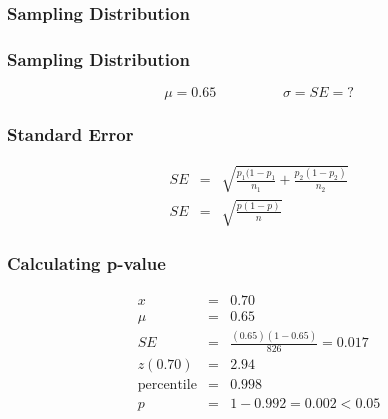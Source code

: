 \documentclass{beamer}
\begin{document}
\begin{frame}
  \frametitle{Sampling Distribution}
  \centering
\end{frame}

\begin{frame}
  \frametitle{Sampling Distribution}
  \centering
  \begin{equation*}
    \mu = 0.65 \hspace{2cm} \sigma = SE = ?
  \end{equation*}
\end{frame}

\begin{frame}
  \frametitle{Standard Error}
  \begin{displaymath}
    \begin{array}{rcl}
      SE & = & \sqrt{ \frac{p_1(1-p_1}{n_1} + \frac{p_2(1-p_2)}{n_2}
      }\\[2em]
      SE & = & \sqrt{ \frac{p(1-p)}{n}} 
    \end{array}
  \end{displaymath} 
\end{frame}

\begin{frame}
  \frametitle{Calculating p-value}
  \begin{displaymath}
    \begin{array}{rcl}
      x & = & 0.70 \\[2em]
      \mu & = & 0.65\\[2em]
      SE & = & \frac{(0.65)(1-0.65)}{826} = 0.017\\[2em]
      z(0.70) & = & 2.94 \\[2em]
      \text{percentile} & = & 0.998 \\[2em]
      p & = & 1 - 0.992 = 0.002 < 0.05 
    \end{array}
  \end{displaymath} 
\end{frame}
\end{document}
